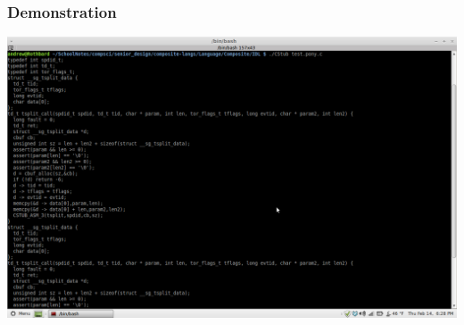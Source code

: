 \documentclass[bigger]{beamer}
\begin{document}
\begin{frame}
\frametitle{Demonstration}
\label{sec-11}

\includegraphics[scale=0.25]{../pictures/demo.png}
\end{frame}
\end{document}
